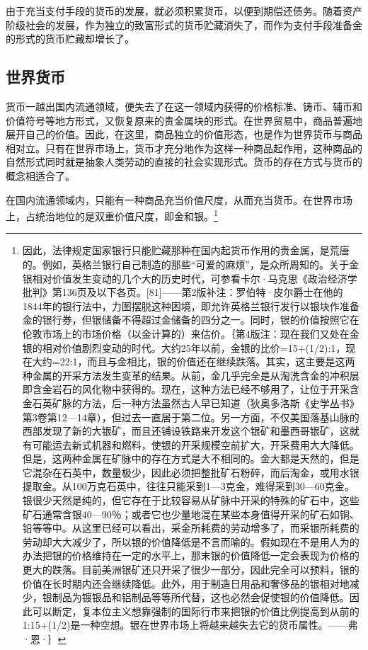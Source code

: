 \documentclass{ctexbook}
\begin{document}
        由于充当支付手段的货币的发展，就必须积累货币，以便到期偿还债务。随着资产阶级社会的发展，作为独立的致富形式的货币贮藏消失了，而作为支付手段准备金的形式的货币贮藏却增长了。

        \subsection{世界货币}

        货币一越出国内流通领域，便失去了在这一领域内获得的价格标准、铸币、辅币和价值符号等地方形式，又恢复原来的贵金属块的形式。在世界贸易中，商品普遍地展开自己的价值。因此，在这里，商品独立的价值形态，也是作为世界货币与商品相对立。只有在世界市场上，货币才充分地作为这样一种商品起作用，这种商品的自然形式同时就是抽象人类劳动的直接的社会实现形式。货币的存在方式与货币的概念相适合了。

        在国内流通领域内，只能有一种商品充当价值尺度，从而充当货币。在世界市场上，占统治地位的是双重价值尺度，即金和银。\footnote{因此，法律规定国家银行只能贮藏那种在国内起货币作用的贵金属，是荒唐的。例如，英格兰银行自己制造的那些“可爱的麻烦”，是众所周知的。关于金银相对价值发生变动的几个大的历史时代，可参看卡尔·马克思《政治经济学批判》第136页及以下各页。[81]——第2版补注：罗伯特·皮尔爵士在他的1844年的银行法中，力图摆脱这种困境，即允许英格兰银行发行以银块作准备金的银行券，但银储备不得超过金储备的四分之一。同时，银的价值按照它在伦敦市场上的市场价格（以金计算的）来估价。｛第4版注：现在我们又处在金银的相对价值剧烈变动的时代。大约25年以前，金银的比价=15+(1/2):1，现在大约=22:1，而且与金相比，银的价值还在继续跌落。其实，这主要是这两种金属的开采方法发生变革的结果。从前，金几乎完全是从淘洗含金的冲积层即含金岩石的风化物中获得的。现在，这种方法已经不够用了，让位于开采含金石英矿脉的方法，后一种方法虽然古人早已知道（狄奥多洛斯《史学丛书》第3卷第12—14章），但过去一直居于第二位。另一方面，不仅美国落基山脉的西部发现了新的大银矿，而且还铺设铁路来开发这个银矿和墨西哥银矿，这就有可能运去新式机器和燃料，使银的开采规模空前扩大，开采费用大大降低。但是，这两种金属在矿脉中的存在方式是大不相同的。金大都是天然的，但是它混杂在石英中，数量极少，因此必须把整批矿石粉碎，而后淘金，或用水银提取金。从100万克石英中，往往只能采到1—3克金，难得采到30—60克金。银很少天然是纯的，但它存在于比较容易从矿脉中开采的特殊的矿石中，这些矿石通常含银40—90％；或者它也少量地混在某些本身值得开采的矿石如铜、铅等等中。从这里已经可以看出，采金所耗费的劳动增多了，而采银所耗费的劳动却大大减少了，所以银的价值降低是不言而喻的。假如现在不是用人为的办法把银的价格维持在一定的水平上，那末银的价值降低一定会表现为价格的更大的跌落。目前美洲银矿还只开采了很少一部分，因此完全可以预料，银的价值在长时期内还会继续降低。此外，用于制造日用品和奢侈品的银相对地减少，银制品为镀银品和铝制品等等所代替，这也必然会促使银的价值降低。因此可以断定，复本位主义想靠强制的国际行市来把银的价值比例提高到从前的1:15+(1/2)是一种空想。银在世界市场上将越来越失去它的货币属性。——弗·恩·｝}
\end{document}
